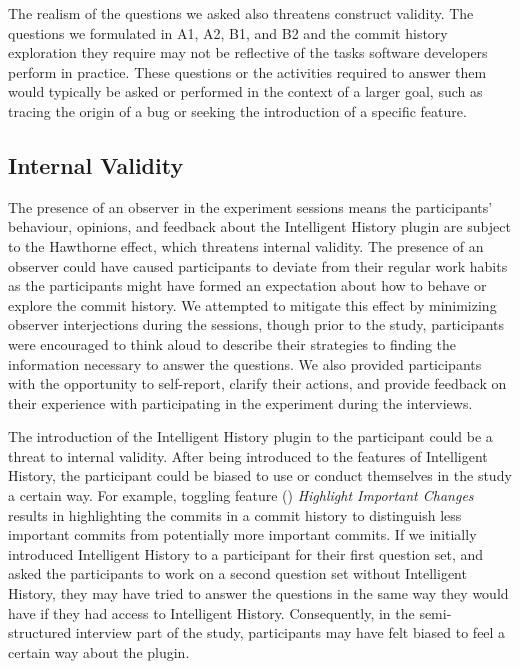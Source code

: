 The realism of the questions we asked also threatens construct validity.
The questions we formulated in A1, A2, B1, and B2 and the commit history exploration 
they require may not be reflective of the tasks software developers perform in practice.
These questions or the activities required to answer them would typically be
asked or performed in the context of a larger goal, 
such as tracing the origin of a bug or seeking the introduction of a specific feature.

\subsection{Internal Validity}

The presence of an observer in the experiment sessions means the participants' behaviour, opinions, 
and feedback about the Intelligent History plugin are subject to the Hawthorne effect,
which threatens internal validity.
The presence of an observer could have caused participants to deviate from their regular work habits 
as the participants might have formed an expectation about how to behave or explore the commit history.
We attempted to mitigate this effect by minimizing observer interjections during the sessions, 
though prior to the study, participants were encouraged to think aloud to describe their strategies 
to finding the information necessary to answer the questions.
We also provided participants with the opportunity to self-report, clarify their actions, 
and provide feedback on their experience with participating in the experiment during the interviews.

The introduction of the Intelligent History plugin to the participant could be a threat to internal validity.
After being introduced to the features of Intelligent History, 
the participant could be biased to use or conduct themselves in the study a certain way.
For example, toggling feature () \textit{Highlight Important Changes} 
results in highlighting the commits in a commit history to distinguish less important commits from potentially more important commits.
If we initially introduced Intelligent History to a participant for their first question set,
and asked the participants to work on a second question set without Intelligent History,
they may have tried to answer the questions in the same way they would have if they had access to Intelligent History.
Consequently, in the semi-structured interview part of the study, 
participants may have felt biased to feel a certain way about the plugin.

